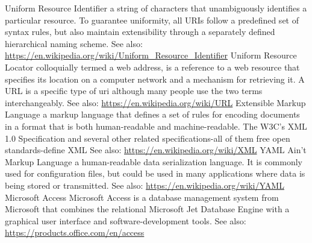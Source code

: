 	{Uniform Resource Identifier}
	{a string of characters that unambiguously identifies a particular resource. To guarantee uniformity, all URIs follow a predefined set of syntax rules, but also maintain extensibility through a separately defined hierarchical naming scheme. See also: \url{https://en.wikipedia.org/wiki/Uniform_Resource_Identifier}}
	{Uniform Resource Locator }
	{colloquially termed a web address, is a reference to a web resource that specifies its location on a computer network and a mechanism for retrieving it. A URL is a specific type of \gls{uri} although many people use the two terms interchangeably. See also: \url{https://en.wikipedia.org/wiki/URL}}
	{Extensible Markup Language}
	{a markup language that defines a set of rules for encoding documents in a format that is both human-readable and machine-readable. The W3C's XML 1.0 Specification and several other related specifications-all of them free open standards-define XML See also: \url{https://en.wikipedia.org/wiki/XML}}
	{YAML Ain't Markup Language}
	{a human-readable data serialization language. It is commonly used for configuration files, but could be used in many applications where data is being stored or transmitted.  See also: \url{https://en.wikipedia.org/wiki/YAML}}
	{Microsoft Access}
	{Microsoft Access is a database management system from Microsoft that combines the relational Microsoft Jet Database Engine with a graphical user interface and software-development tools. See also: \url{https://products.office.com/en/access}}
